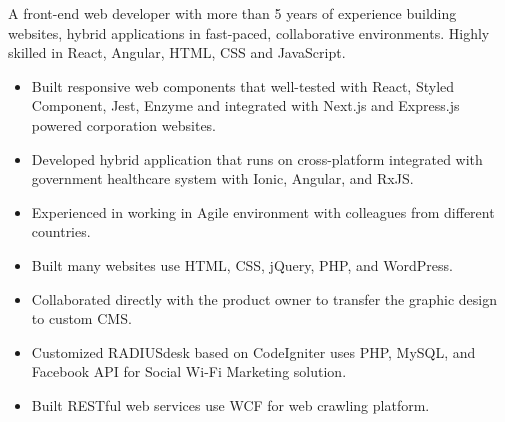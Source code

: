 \documentclass[10pt,a4paper,ragged2e]{altacv}
\begin{document}

\begin{fullwidth}
\makecvheader
\end{fullwidth}

A front-end web developer with more than 5 years of experience building websites, hybrid applications in fast-paced, collaborative environments. Highly skilled in React, Angular, HTML, CSS and JavaScript.

\begin{itemize}
\item Built responsive web components that well-tested with React, Styled Component, Jest, Enzyme and integrated with Next.js and Express.js powered corporation websites.
\item Developed hybrid application that runs on cross-platform integrated with government healthcare system with Ionic, Angular, and RxJS.
\item Experienced in working in Agile environment with colleagues from different countries.
\end{itemize}
\divider

\begin{itemize}
\item Built many websites use HTML, CSS, jQuery, PHP, and WordPress.
\item Collaborated directly with the product owner to transfer the graphic design to custom CMS.
\end{itemize}
\divider

\begin{itemize}
\item Customized RADIUSdesk based on CodeIgniter uses PHP, MySQL, and Facebook API for Social Wi-Fi Marketing solution.
\end{itemize}
\divider

\begin{itemize}
\item Built RESTful web services use WCF for web crawling platform.
\end{itemize}
\end{document}
